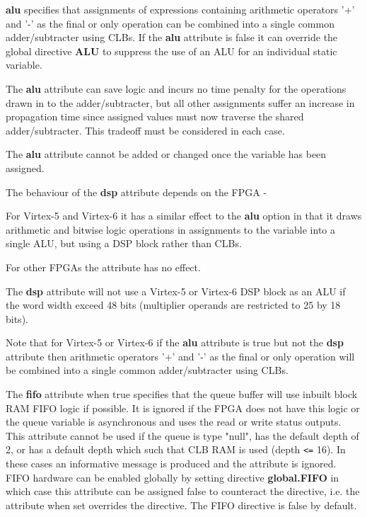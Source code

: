        {\bf alu} specifies that assignments of expressions containing
        arithmetic operators '+' and '-' as the final or only operation can be
        combined into a single common adder/subtracter using CLBs. If the {\bf alu}
        attribute is false it can override the global directive {\bf ALU} to
        suppress the use of an ALU for an individual static variable.
        
        The {\bf alu} attribute can save logic and incurs no time penalty for the
        operations drawn in to the adder/subtracter, but all other assignments
        suffer an increase in propagation time since assigned values must now
        traverse the shared adder/subtracter. This tradeoff must be considered
        in each case.
        
        The {\bf alu} attribute cannot be added or changed once the variable has been
        assigned.
        
        The behaviour of the {\bf dsp} attribute depends on the FPGA -
        \blist
        \item   For Virtex-5 and Virtex-6 it has a similar effect to the
                {\bf alu} option in that it draws arithmetic and bitwise logic
                operations in assignments to the variable into a single ALU,
                but using a DSP block rather than CLBs.
        \item   For other FPGAs the attribute has no effect.
        \blend
        
        The {\bf dsp} attribute will not use a Virtex-5 or Virtex-6 DSP block as an
        ALU if the word width exceed 48 bits (multiplier operands are restricted
        to 25 by 18 bits).
        
        Note that for Virtex-5 or Virtex-6 if the {\bf alu} attribute is true but not
        the {\bf dsp} attribute then arithmetic operators '+' and '-' as the final or
        only operation will be combined into a single common adder/subtracter
        using CLBs.
        
        The {\bf fifo} attribute when true specifies that the queue buffer will
        use inbuilt block RAM FIFO logic if possible. It is ignored if the FPGA
        does not have this logic or the queue variable is asynchronous and uses
        the read or write status outputs. This attribute cannot be used if the
        queue is type "null", has the default depth of 2, or has a default depth
        which such that CLB RAM is used (depth \verb'<=' 16). In these cases an
        informative message is produced and the attribute is ignored. FIFO
        hardware can be enabled globally by setting directive {\bf global.FIFO}
        in which case this attribute can be assigned false to counteract the
        directive, i.e. the attribute when set overrides the directive. The FIFO
        directive is false by default.
        
